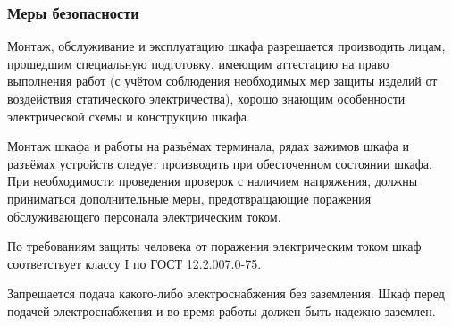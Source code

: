 \subsubsection{Меры безопасности}
\begin{enumsubsub}
\item Монтаж, обслуживание и эксплуатацию шкафа разрешается производить лицам, прошедшим специальную подготовку, имеющим аттестацию на право выполнения работ (с учётом соблюдения необходимых мер защиты изделий от воздействия статического электричества), хорошо знающим особенности электрической схемы и конструкцию шкафа.
\item Монтаж шкафа и работы на разъёмах терминала, рядах зажимов шкафа и разъёмах устройств следует производить при обесточенном состоянии шкафа. При необходимости проведения проверок с наличием напряжения, должны приниматься дополнительные меры, предотвращающие поражения обслуживающего персонала электрическим током.
\item По требованиям защиты человека от поражения электрическим током шкаф соответствует классу I по ГОСТ 12.2.007.0-75.
\item Запрещается подача какого-либо электроснабжения без заземления. Шкаф перед подачей электроснабжения и во время работы должен быть надежно заземлен.
\end{enumsubsub}

%

